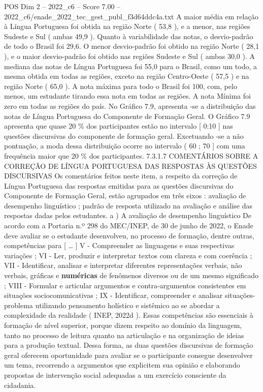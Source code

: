\begin{textsample}{POS Dim 2 – 2022\_c6 – Score 7.00 – 2022\_c6/enade\_2022\_tec\_gest\_publ\_f3d64ddc4a.txt}
A maior média em relação à Língua Portuguesa foi obtida na região Norte ( 53,8 ), e a menor, nas regiões Sudeste e Sul ( ambas 49,9 ).
Quanto à variabilidade das notas, o desvio-padrão de todo o Brasil foi 29,6.
O menor desvio-padrão foi obtido na região Norte ( 28,1 ), e o maior desvio-padrão foi obtido nas regiões Sudeste e Sul ( ambas 30,0 ).
A mediana das notas de Língua Portuguesa foi 55,0 para o Brasil, como um todo, a mesma obtida em todas as regiões, exceto na região Centro-Oeste ( 57,5 ) e na região Norte ( 65,0 ).
A nota máxima para todo o Brasil foi 100, com, pelo menos, um estudante tirando essa nota em todas as regiões.
A nota Mínima foi zero em todas as regiões do país.
No Gráfico 7.9, apresenta -se a distribuição das notas de Língua Portuguesa do Componente de Formação Geral.
O Gráfico 7.9 apresenta que quase 20 \% dos participantes estão no intervalo [ 0:10 ] nas questões discursivas do componente de formação geral.
Excetuando -se a não pontuação, a moda dessa distribuição ocorre no intervalo ( 60 ; 70 ] com uma frequência maior que 20 \% dos participantes. 7.3.1.7 COMENTÁRIOS SOBRE A CORREÇÃO DE LÍNGUA PORTUGUESA DAS RESPOSTAS ÀS QUESTÕES DISCURSIVAS Os comentários feitos neste item, a respeito da correção de Língua Portuguesa das respostas emitidas para as questões discursivas do Componente de Formação Geral, estão agrupados em três eixos : avaliação de desempenho linguístico ; padrão de resposta utilizado na avaliação e análise das respostas dadas pelos estudantes. a ) A avaliação de desempenho linguístico De acordo com a Portaria n.º 298 do MEC/INEP, de 30 de junho de 2022, o Enade deve avaliar se o estudante desenvolveu, no processo de formação, dentre outras, competências para [ … ] V - Compreender as linguagens e suas respectivas variações ; VI - Ler, produzir e interpretar textos com clareza e com coerência ; VII - Identificar, analisar e interpretar diferentes representações verbais, não verbais, gráficas e \textbf{numéricas} de fenômenos diversos ou de um mesmo significado ; VIII - Formular e articular argumentos e contra-argumentos consistentes em situações sociocomunicativas ; IX - Identificar, compreender e analisar situações-problema utilizando pensamento holístico e sistêmico ao se abordar a complexidade da realidade ( INEP, 2022d ).
Essas competências são essenciais à formação de nível superior, porque dizem respeito ao domínio da linguagem, tanto no processo de leitura quanto na articulação e na organização de ideias para a produção textual.
Dessa forma, as duas questões discursivas de formação geral oferecem oportunidade para avaliar se o participante consegue desenvolver um tema, recorrendo a argumentos que explicitem sua opinião e elaborando propostas de intervenção social adequadas a um exercício consciente da cidadania.

\end{textsample}
